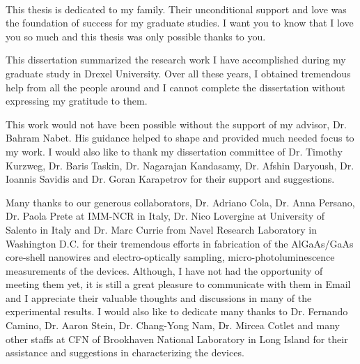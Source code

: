 \begin{preamble}

\iffinal{}{\newpage}

\begin{DUTdedications}
%
\vspace*{\fill}
%
\begin{center}
\begin{minipage}{8 cm}
\begin{center}
\hrulefill\\

This thesis is dedicated to my family. Their unconditional support and love was
the foundation of success for my graduate studies. I want you to know that I love
you so much and this thesis was only possible thanks to you.

\hrulefill
\vspace{6em}
\end{center}
\end{minipage}
\end{center}
\vspace*{\fill}
\end{DUTdedications}

\iffinal{}{\newpage}

\begin{acknowledgments}

This dissertation summarized the research work I have accomplished during my
graduate study in Drexel University. Over all these years, I obtained
tremendous help from all the people around and I cannot complete the dissertation
without expressing my gratitude to them.

This work would not have been possible without the support of my advisor, Dr.
Bahram Nabet. His guidance helped to shape and provided much needed focus to my
work. I would also like to thank my dissertation committee of Dr. Timothy
Kurzweg, Dr. Baris Taskin, Dr. Nagarajan Kandasamy, Dr. Afshin Daryoush, Dr.
Ioannis Savidis and Dr. Goran Karapetrov for their support and suggestions.

Many thanks to our generous collaborators, Dr. Adriano Cola, Dr. Anna Persano,
Dr. Paola Prete at IMM-NCR in Italy, Dr. Nico Lovergine at University of
Salento in Italy and Dr. Marc Currie from Navel Research Laboratory in
Washington D.C. for their tremendous efforts in fabrication of the AlGaAs/GaAs
core-shell nanowires and electro-optically sampling, micro-photoluminescence
measurements of the devices. Although, I have not had the opportunity of
meeting them yet, it is still a great pleasure to communicate with them in
Email and I appreciate their valuable thoughts and discussions in many of the
experimental results. I would also like to dedicate many thanks to Dr. Fernando
Camino, Dr. Aaron Stein, Dr. Chang-Yong Nam, Dr. Mircea Cotlet and many other
staffs at CFN of Brookhaven National Laboratory in Long Island for their
assistance and suggestions in characterizing the devices.


\end{acknowledgments}
\end{preamble}
